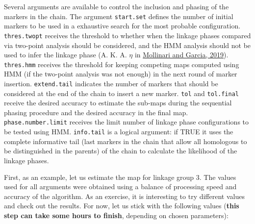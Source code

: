 \documentclass[
]{article}
\newenvironment{Shaded}{}{}
\newcommand{\DataTypeTok}[1]{\textcolor[rgb]{0.56,0.13,0.00}{#1}}
\newcommand{\DecValTok}[1]{\textcolor[rgb]{0.25,0.63,0.44}{#1}}
\newcommand{\FloatTok}[1]{\textcolor[rgb]{0.25,0.63,0.44}{#1}}
\newcommand{\KeywordTok}[1]{\textcolor[rgb]{0.00,0.44,0.13}{\textbf{#1}}}
\newcommand{\NormalTok}[1]{#1}
\newcommand{\OperatorTok}[1]{\textcolor[rgb]{0.40,0.40,0.40}{#1}}
\newcommand{\OtherTok}[1]{\textcolor[rgb]{0.00,0.44,0.13}{#1}}
\newcommand{\StringTok}[1]{\textcolor[rgb]{0.25,0.44,0.63}{#1}}
\begin{document}
Several arguments are available to control the inclusion and phasing of
the markers in the chain. The argument \texttt{start.set} defines the
number of initial markers to be used in a exhaustive search for the most
probable configuration. \texttt{thres.twopt} receives the threshold to
whether when the linkage phases compared via two-point analysis should
be considered, and the HMM analysis should not be used to infer the
linkage phase (A. K. A. \(\eta\) in
\href{https://doi.org/10.1534/g3.119.400378}{Mollinari and Garcia,
2019}). \texttt{thres.hmm} receives the threshold for keeping competing
maps computed using HMM (if the two-point analysis was not enough) in
the next round of marker insertion. \texttt{extend.tail} indicates the
number of markers that should be considered at the end of the chain to
insert a new marker. \texttt{tol} and \texttt{tol.final} receive the
desired accuracy to estimate the sub-maps during the sequential phasing
procedure and the desired accuracy in the final map.
\texttt{phase.number.limit} receives the limit number of linkage phase
configurations to be tested using HMM. \texttt{info.tail} is a logical
argument: if TRUE it uses the complete informative tail (last markers in
the chain that allow all homologous to be distinguished in the parents)
of the chain to calculate the likelihood of the linkage phases.

First, as an example, let us estimate the map for linkage group 3. The
values used for all arguments were obtained using a balance of
processing speed and accuracy of the algorithm. As an exercise, it is
interesting to try different values and check out the results. For now,
let us stick with the following values (\textbf{this step can take some
hours to finish}, depending on chosen parameters):

\begin{Shaded}
\end{Shaded}
\end{document}

